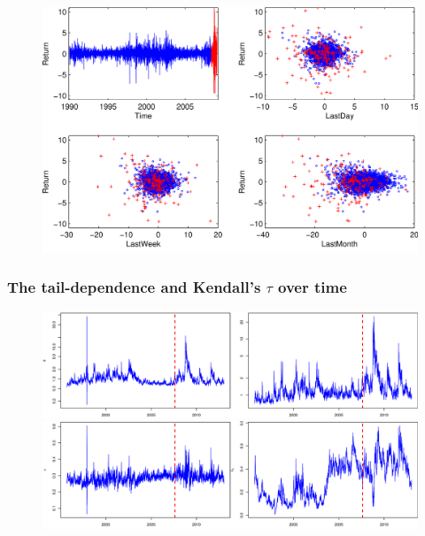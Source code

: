 \documentclass{beamer}
\begin{document}
\begin{frame}
  \begin{figure}
    \centering
    \includegraphics[height=0.8\textheight]{SP500}
  \end{figure}
\end{frame}


\begin{frame}
  \frametitle{The tail-dependence and Kendall's $\tau$ over time}
  \begin{figure}
    \centering
    \includegraphics[height=0.34\textheight]{var-post}\\
    \includegraphics[height=0.35\textheight]{tau-post}
  \end{figure}
\end{frame}
\end{document}
